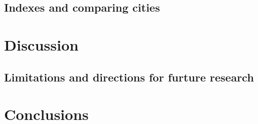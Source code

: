 \documentclass[preprint, 3p,
authoryear]{elsarticle} %
\begin{document}
\hypertarget{indexes-and-comparing-cities}{%
\subsection{Indexes and comparing
cities}\label{indexes-and-comparing-cities}}

\hypertarget{discussion}{%
\section{Discussion}\label{discussion}}

\hypertarget{limitations-and-directions-for-furture-research}{%
\subsection{Limitations and directions for furture
research}\label{limitations-and-directions-for-furture-research}}

\hypertarget{conclusions}{%
\section{Conclusions}\label{conclusions}}

\renewcommand\refname{References}

\end{document}
